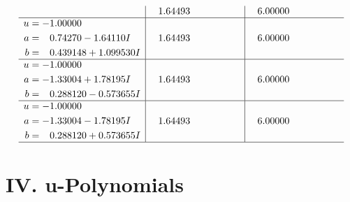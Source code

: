 \documentclass[1p]{elsarticle_modified}
\theoremstyle{definition}
\begin{document}
$$\begin{array}{c|c|c}
 & \phantom{-}1.64493\phantom{ +0.000000I} & \phantom{-}6.00000\phantom{ +0.000000I} \\ \hline\begin{aligned}
u &= -1.00000\phantom{ +0.000000I} \\
a &= \phantom{-}0.74270 - 1.64110 I \\
b &= \phantom{-}0.439148 + 1.099530 I\end{aligned}
 & \phantom{-}1.64493\phantom{ +0.000000I} & \phantom{-}6.00000\phantom{ +0.000000I} \\ \hline\begin{aligned}
u &= -1.00000\phantom{ +0.000000I} \\
a &= -1.33004 + 1.78195 I \\
b &= \phantom{-}0.288120 - 0.573655 I\end{aligned}
 & \phantom{-}1.64493\phantom{ +0.000000I} & \phantom{-}6.00000\phantom{ +0.000000I} \\ \hline\begin{aligned}
u &= -1.00000\phantom{ +0.000000I} \\
a &= -1.33004 - 1.78195 I \\
b &= \phantom{-}0.288120 + 0.573655 I\end{aligned}
 & \phantom{-}1.64493\phantom{ +0.000000I} & \phantom{-}6.00000\phantom{ +0.000000I}\\
 \hline 
 \end{array}$$\newpage
\newpage\renewcommand{\arraystretch}{1}
\centering \section*{ IV. u-Polynomials}
\end{document}
